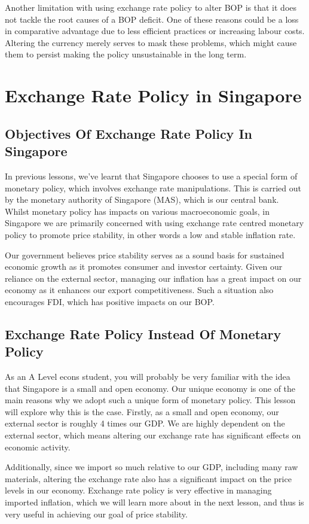\documentclass[DIV=calc,11pt,parskip,numbers=noenddot]{scrartcl} %
\begin{document}
Another limitation with using exchange rate policy to alter BOP is that it does not tackle the root causes of a BOP deficit. One of these reasons could be a loss in comparative advantage due to less efficient practices or increasing labour costs. Altering the currency merely serves to mask these problems, which might cause them to persist making the policy unsustainable in the long term.
\newpage
\section{Exchange Rate Policy in Singapore}
\subsection{Objectives Of Exchange Rate Policy In Singapore}
In previous lessons, we’ve learnt that Singapore chooses to use a special form of monetary policy, which involves exchange rate manipulations. This is carried out by the monetary authority of Singapore (MAS), which is our central bank. Whilst monetary policy has impacts on various macroeconomic goals, in Singapore we are primarily concerned with using exchange rate centred monetary policy to promote price stability, in other words a low and stable inflation rate.

Our government believes price stability serves as a sound basis for sustained economic growth as it promotes consumer and investor certainty. Given our reliance on the external sector, managing our inflation has a great impact on our economy as it enhances our export competitiveness. Such a situation also encourages FDI, which has positive impacts on our BOP.
\subsection{Exchange Rate Policy Instead Of Monetary Policy}
As an A Level econs student, you will probably be very familiar with the idea that Singapore is a small and open economy. Our unique economy is one of the main reasons why we adopt such a unique form of monetary policy. This lesson will explore why this is the case.
Firstly, as a small and open economy, our external sector is roughly 4 times our GDP. We are highly dependent on the external sector, which means altering our exchange rate has significant effects on economic activity.

Additionally, since we import so much relative to our GDP, including many raw materials, altering the exchange rate also has a significant impact on the price levels in our economy. Exchange rate policy is very effective in managing imported inflation, which we will learn more about in the next lesson, and thus is very useful in achieving our goal of price stability.
\end{document}
